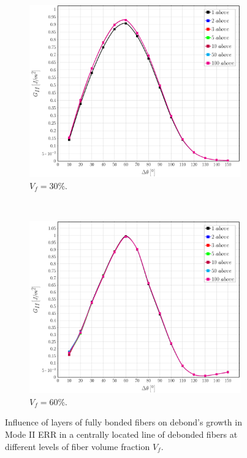 \documentclass[review]{elsarticle}
\begin{document}
\begin{figure}[!h]
\centering
    \begin{subfigure}[b]{0.45\textwidth}
        \includegraphics[width=\textwidth]{abovefibers-vf30-GII.pdf}
        \caption{$V_{f}=30\%$.}\label{subfig:sidefiber30MII}
    \end{subfigure} ~
    \begin{subfigure}[b]{0.45\textwidth}
        \includegraphics[width=\textwidth]{abovefibers-vf60-GII.pdf}
        \caption{$V_{f}=60\%$.}\label{subfig:sidefiber60MII}
    \end{subfigure}

\caption{Influence of layers of fully bonded fibers on debond's growth in Mode II ERR in a centrally located line of debonded fibers at different levels of fiber volume fraction $V_{f}$.}\label{fig:abovefibersMII}
\end{figure}
\end{document}
